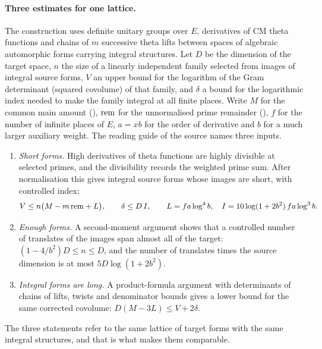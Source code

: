 \paragraph{Three estimates for one lattice.}
The construction uses definite unitary groups over $E$, derivatives of CM theta functions and
chains of $m$ successive theta lifts between spaces of algebraic automorphic forms carrying
integral structures. Let $D$ be the dimension of the target space, $n$ the size of a linearly
independent family selected from images of integral source forms, $V$ an upper bound for the
logarithm of the Gram determinant (squared covolume) of that family, and $\delta$ a bound for
the logarithmic index needed to make the family integral at all finite places. Write $M$ for
the common main amount (), $\mathrm{rem}$ for the unnormalised prime remainder
(), $f$ for the number of infinite places of $E$, $a=xb$ for the order
of derivative and $b$ for a much larger auxiliary weight. The reading guide of the source
names three inputs.
\begin{enumerate}[label=\textup{(\Alph*)}]
\item \emph{Short forms.} High derivatives of theta functions are highly divisible at
selected primes, and the divisibility records the weighted prime sum. After normalisation
this gives integral source forms whose images are short, with controlled index:
\[
V\le n\bigl(M-m\,\mathrm{rem}+L\bigr),\qquad \delta\le D\,I,\qquad
L=fa\log^4b,\quad I=10\log(1+2b^2)\,fa\log^3b .
\]
\item \emph{Enough forms.} A second-moment argument shows that a controlled number of
translates of the images span almost all of the target: $(1-4/b^2)D\le n\le D$, and the number
of translates times the source dimension is at most $5D\log(1+2b^2)$.
\item \emph{Integral forms are long.} A product-formula argument with determinants of chains
of lifts, twists and denominator bounds gives a lower bound for the same corrected covolume:
$D(M-3L)\le V+2\delta$.
\end{enumerate}
The three statements refer to the same lattice of target forms with the same integral
structures, and that is what makes them comparable.

